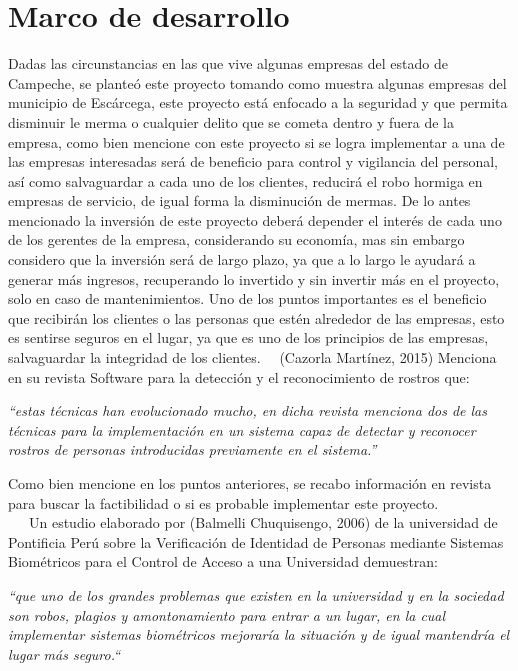 \documentclass{comjnl}
\begin{document}
\section{Marco de desarrollo} \label{Model}
Dadas las circunstancias en las que vive algunas empresas del estado de Campeche, se planteó este proyecto tomando como muestra algunas empresas del municipio de Escárcega, este proyecto está enfocado a la seguridad y que permita disminuir le merma o cualquier delito que se cometa dentro y fuera de la empresa, como bien mencione con este proyecto si se logra implementar a una de las empresas interesadas será de beneficio para control y vigilancia del personal, así como salvaguardar a cada uno de los clientes, reducirá el robo hormiga en empresas de servicio, de igual forma la disminución de mermas. De lo antes mencionado la inversión de este proyecto deberá depender el interés de cada uno de los gerentes de la empresa, considerando su economía, mas sin embargo considero que la inversión será de largo plazo, ya que a lo largo le ayudará a generar más ingresos, recuperando lo invertido y sin invertir más en el proyecto, solo en caso de mantenimientos. Uno de los puntos importantes es el beneficio que recibirán los clientes o las personas que estén alrededor de las empresas, esto es sentirse seguros en el lugar, ya que es uno de los principios de las empresas, salvaguardar la integridad de los clientes.
\ \  (Cazorla Martínez, 2015) Menciona en su revista Software para la detección y el reconocimiento de rostros que:
\begin{center}
	
\textit{“estas técnicas han evolucionado mucho, en dicha revista menciona dos de las técnicas para la implementación en un sistema capaz de detectar y reconocer rostros de personas introducidas previamente en el sistema.”}\\
\end{center}
Como bien mencione en los puntos anteriores, se recabo información en revista para buscar la factibilidad o si es probable implementar este proyecto.\\
\ \ \  Un estudio elaborado por (Balmelli Chuquisengo, 2006) de la universidad de Pontificia Perú sobre la Verificación de Identidad de Personas mediante Sistemas Biométricos para el Control de Acceso a una Universidad demuestran:
\begin{center}
\textit{“que uno de los grandes problemas que existen en la universidad y en la sociedad son robos, plagios y amontonamiento para entrar a un lugar, en la cual implementar sistemas biométricos mejoraría la situación y de igual mantendría el lugar más seguro.“}
\end{center}\ \ \
\end{document}
